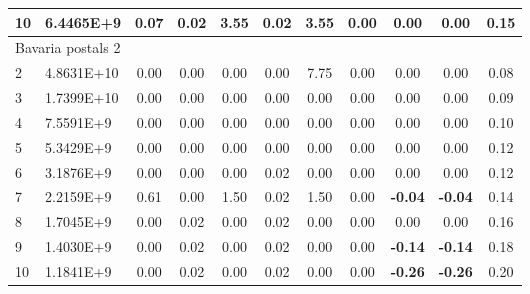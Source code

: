 {\begin{longtable}{@{}llccccccccc@{}}
\multicolumn{1}{l|}{10} & \multicolumn{1}{l|}{6.4465E+9}  & 0.07 & \multicolumn{1}{c|}{0.02} & 3.55 & \multicolumn{1}{c|}{0.02} & 3.55 & \multicolumn{1}{c|}{0.00} & 0.00           & 0.00           & 0.15 \\ \hline
\multicolumn{11}{l}{Bavaria postals 2}                                                                                                                                                                      \\ \hline
\multicolumn{1}{l|}{2}  & \multicolumn{1}{l|}{4.8631E+10} & 0.00 & \multicolumn{1}{c|}{0.00} & 0.00 & \multicolumn{1}{c|}{0.00} & 7.75 & \multicolumn{1}{c|}{0.00} & 0.00           & 0.00           & 0.08 \\
\multicolumn{1}{l|}{3}  & \multicolumn{1}{l|}{1.7399E+10} & 0.00 & \multicolumn{1}{c|}{0.00} & 0.00 & \multicolumn{1}{c|}{0.00} & 0.00 & \multicolumn{1}{c|}{0.00} & 0.00           & 0.00           & 0.09 \\
\multicolumn{1}{l|}{4}  & \multicolumn{1}{l|}{7.5591E+9}  & 0.00 & \multicolumn{1}{c|}{0.00} & 0.00 & \multicolumn{1}{c|}{0.00} & 0.00 & \multicolumn{1}{c|}{0.00} & 0.00           & 0.00           & 0.10 \\
\multicolumn{1}{l|}{5}  & \multicolumn{1}{l|}{5.3429E+9}  & 0.00 & \multicolumn{1}{c|}{0.00} & 0.00 & \multicolumn{1}{c|}{0.00} & 0.00 & \multicolumn{1}{c|}{0.00} & 0.00           & 0.00           & 0.12 \\
\multicolumn{1}{l|}{6}  & \multicolumn{1}{l|}{3.1876E+9}  & 0.00 & \multicolumn{1}{c|}{0.00} & 0.00 & \multicolumn{1}{c|}{0.02} & 0.00 & \multicolumn{1}{c|}{0.00} & 0.00           & 0.00           & 0.12 \\
\multicolumn{1}{l|}{7}  & \multicolumn{1}{l|}{2.2159E+9}  & 0.61 & \multicolumn{1}{c|}{0.00} & 1.50 & \multicolumn{1}{c|}{0.02} & 1.50 & \multicolumn{1}{c|}{0.00} & \textbf{-0.04} & \textbf{-0.04} & 0.14 \\
\multicolumn{1}{l|}{8}  & \multicolumn{1}{l|}{1.7045E+9}  & 0.00 & \multicolumn{1}{c|}{0.02} & 0.00 & \multicolumn{1}{c|}{0.02} & 0.00 & \multicolumn{1}{c|}{0.00} & 0.00           & 0.00           & 0.16 \\
\multicolumn{1}{l|}{9}  & \multicolumn{1}{l|}{1.4030E+9}  & 0.00 & \multicolumn{1}{c|}{0.02} & 0.00 & \multicolumn{1}{c|}{0.02} & 0.00 & \multicolumn{1}{c|}{0.00} & \textbf{-0.14} & \textbf{-0.14} & 0.18 \\
\multicolumn{1}{l|}{10} & \multicolumn{1}{l|}{1.1841E+9}  & 0.00 & \multicolumn{1}{c|}{0.02} & 0.00 & \multicolumn{1}{c|}{0.02} & 0.00 & \multicolumn{1}{c|}{0.00} & \textbf{-0.26} & \textbf{-0.26} & 0.20 \\ \hline

\end{longtable}}
